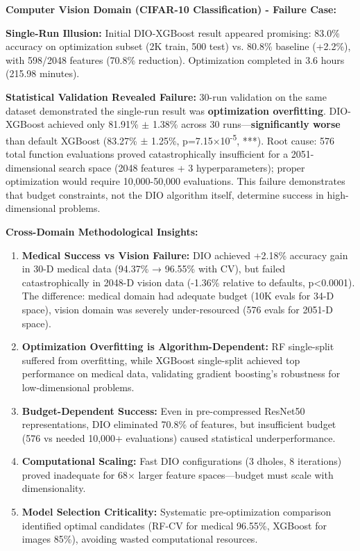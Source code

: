 \documentclass[12pt, a4paper]{article}
\begin{document}
\textbf{Computer Vision Domain (CIFAR-10 Classification) - Failure Case:}

\textbf{Single-Run Illusion:} Initial DIO-XGBoost result appeared promising: 83.0\% accuracy on optimization subset (2K train, 500 test) vs. 80.8\% baseline (+2.2\%), with 598/2048 features (70.8\% reduction). Optimization completed in 3.6 hours (215.98 minutes).

\textbf{Statistical Validation Revealed Failure:} 30-run validation on the same dataset demonstrated the single-run result was \textbf{optimization overfitting}. DIO-XGBoost achieved only 81.91\% $\pm$ 1.38\% across 30 runs—\textbf{significantly worse} than default XGBoost (83.27\% $\pm$ 1.25\%, p=7.15×10\textsuperscript{-5}, ***). Root cause: 576 total function evaluations proved catastrophically insufficient for a 2051-dimensional search space (2048 features + 3 hyperparameters); proper optimization would require 10,000-50,000 evaluations. This failure demonstrates that budget constraints, not the DIO algorithm itself, determine success in high-dimensional problems.

\textbf{Cross-Domain Methodological Insights:}
\begin{enumerate}
    \item \textbf{Medical Success vs Vision Failure:} DIO achieved +2.18\% accuracy gain in 30-D medical data (94.37\% → 96.55\% with CV), but failed catastrophically in 2048-D vision data (-1.36\% relative to defaults, p<0.0001). The difference: medical domain had adequate budget (10K evals for 34-D space), vision domain was severely under-resourced (576 evals for 2051-D space).
    
    \item \textbf{Optimization Overfitting is Algorithm-Dependent:} RF single-split suffered from overfitting, while XGBoost single-split achieved top performance on medical data, validating gradient boosting's robustness for low-dimensional problems.
    
    \item \textbf{Budget-Dependent Success:} Even in pre-compressed ResNet50 representations, DIO eliminated 70.8\% of features, but insufficient budget (576 vs needed 10,000+ evaluations) caused statistical underperformance.
    
    \item \textbf{Computational Scaling:} Fast DIO configurations (3 dholes, 8 iterations) proved inadequate for 68$\times$ larger feature spaces---budget must scale with dimensionality.
    
    \item \textbf{Model Selection Criticality:} Systematic pre-optimization comparison identified optimal candidates (RF-CV for medical 96.55\%, XGBoost for images 85\%), avoiding wasted computational resources.
\end{enumerate}
\end{document}

